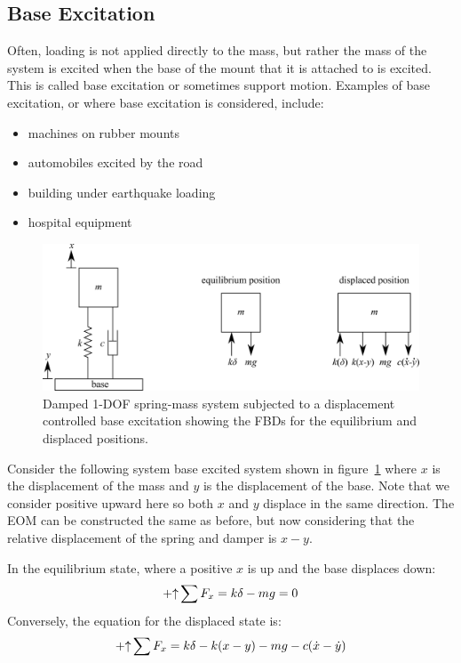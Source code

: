 \documentclass[12pt,letter]{article}
\begin{document}
\subsection{Base Excitation}

	Often, loading is not applied directly to the mass, but rather the mass of the system is excited when the base of the mount that it is attached to is excited. This is called base excitation or sometimes support motion. Examples of base excitation, or where base excitation is considered, include:
	
	\begin{itemize}
	\item machines on rubber mounts
	\item automobiles excited by the road
	\item building under earthquake loading
	\item hospital equipment
	\end{itemize}

	\begin{figure}[H]
		\centering
		\includegraphics[]{../figures/1_DOF_spring_dashpot_mass_vertical_base_excited_FBD.png}
		\caption{Damped 1-DOF spring-mass system subjected to a displacement controlled base excitation showing the FBDs for the equilibrium and displaced positions.}
		\label{fig:1_DOF_spring_dashpot_mass_vertical_base_excited_FBD}
	\end{figure}
	
	Consider the following system base excited system shown in figure~\ref{fig:1_DOF_spring_dashpot_mass_vertical_base_excited_FBD} where $x$ is the displacement of the mass and $y$ is the displacement of the base. Note that we consider positive upward here so both $x$ and $y$ displace in the same direction. The EOM can be constructed the same as before, but now considering that the relative displacement of the spring and damper is $x-y$.

 	In the equilibrium state, where a positive $x$ is up and the base displaces down:
	\begin{equation}
	\mathbin{+\mathord\uparrow} \sum F_x = k\delta -mg =0
	\end{equation}	
	Conversely, the equation for the displaced state is:
	\begin{equation}
	\mathbin{+\mathord\uparrow} \sum F_x = k\delta -k(x - y) -mg -c(\dot{x} -\dot{y})
	\end{equation}	
\end{document}
